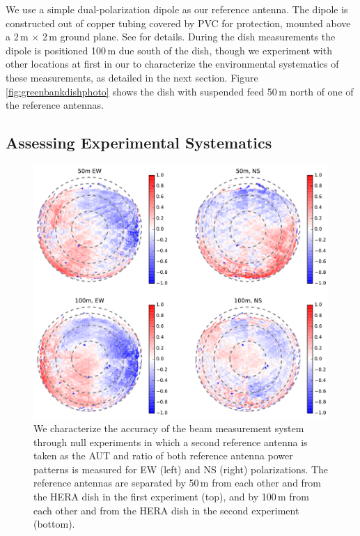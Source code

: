 \documentclass{emulateapj}
\begin{document}
We use a simple dual-polarization dipole as our reference antenna. The dipole is constructed out of copper tubing covered by PVC for protection, mounted above a 2\,m $\times$ 2\,m ground plane. See \citet{neben15} for details. During the dish measurements the dipole is positioned 100\,m due south of the dish, though we experiment with other locations at first in our to characterize the environmental systematics of these measurements, as detailed in the next section. Figure \ref{fig:greenbankdishphoto} shows the dish with suspended feed 50\,m north of one of the reference antennas.

\subsection{Assessing Experimental Systematics}

\begin{figure}[h]
\centering
\includegraphics[width=6.5in]{null_expt_rel_beam_maps.pdf}
\caption{We characterize the accuracy of the beam measurement system through null experiments in which a second reference antenna is taken as the AUT and ratio of both reference antenna power patterns is measured for EW (left) and NS (right) polarizations. The reference antennas are separated by 50\,m from each other and from the HERA dish in the first experiment (top), and by 100\,m from each other and from the HERA dish in the second experiment (bottom).}
\label{fig:nullexptplots}
\end{figure}
\end{document}
